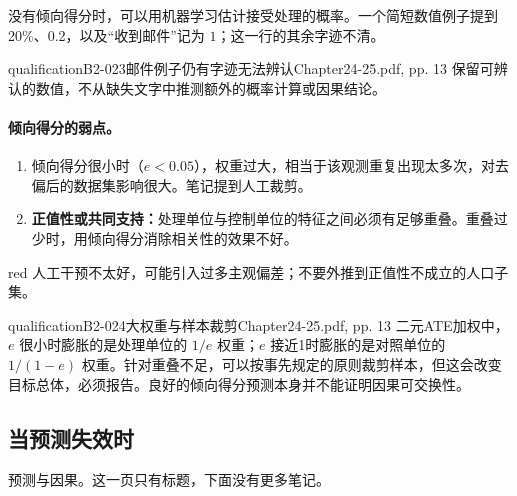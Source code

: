 没有倾向得分时，可以用机器学习估计接受处理的概率。一个简短数值例子提到20\%、0.2，以及“收到邮件”记为 \(1\)；这一行的其余字迹不清。
\begin{reviewnote}{qualification}{B2-023}{邮件例子仍有字迹无法辨认}{Chapter24-25.pdf, pp. 13}
保留可辨认的数值，不从缺失文字中推测额外的概率计算或因果结论。
\end{reviewnote}


\paragraph{倾向得分的弱点。}
\begin{enumerate}
\item 倾向得分很小时（\(e<0.05\)），权重过大，相当于该观测重复出现太多次，对去偏后的数据集影响很大。笔记提到人工裁剪。
\item \textbf{正值性或共同支持：}处理单位与控制单位的特征之间必须有足够重叠。重叠过少时，用倾向得分消除相关性的效果不好。
\end{enumerate}
\begin{inkblock}{red}
人工干预不太好，可能引入过多主观偏差；不要外推到正值性不成立的人口子集。
\end{inkblock}\begin{reviewnote}{qualification}{B2-024}{大权重与样本裁剪}{Chapter24-25.pdf, pp. 13}
二元ATE加权中，\(e\) 很小时膨胀的是处理单位的 \(1/e\) 权重；\(e\) 接近1时膨胀的是对照单位的 \(1/(1-e)\) 权重。针对重叠不足，可以按事先规定的原则裁剪样本，但这会改变目标总体，必须报告。良好的倾向得分预测本身并不能证明因果可交换性。
\par{}
\end{reviewnote}


\subsection{当预测失效时}
预测与因果。这一页只有标题，下面没有更多笔记。
